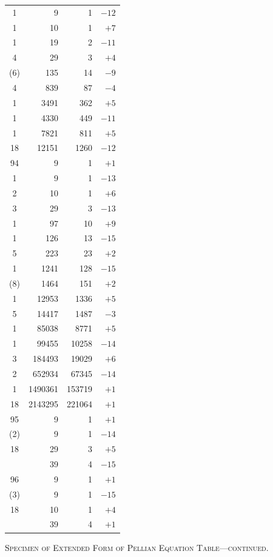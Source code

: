 \documentclass[11pt]{article}
\begin{document}
\begin{center}
\begin{tabular}{|c|r|r|r|}
1 & 9 & 1 & $-12$ \\
1 & 10 & 1 & $+7$ \\
1 & 19 & 2 & $-11$ \\
4 & 29 & 3 & $+4$ \\
(6) & 135 & 14 & $-9$ \\
4 & 839 & 87 & $-4$ \\
1 & 3491 & 362 & $+5$ \\
1 & 4330 & 449 & $-11$ \\
1 & 7821 & 811 & $+5$ \\
18 & 12151 & 1260 & $-12$ \\
\hline
94 & 9 & 1 & $+1$ \\
1 & 9 & 1 & $-13$ \\
2 & 10 & 1 & $+6$ \\
3 & 29 & 3 & $-13$ \\
1 & 97 & 10 & $+9$ \\
1 & 126 & 13 & $-15$ \\
5 & 223 & 23 & $+2$ \\
1 & 1241 & 128 & $-15$ \\
(8) & 1464 & 151 & $+2$ \\
1 & 12953 & 1336 & $+5$ \\
5 & 14417 & 1487 & $-3$ \\
1 & 85038 & 8771 & $+5$ \\
1 & 99455 & 10258 & $-14$ \\
3 & 184493 & 19029 & $+6$ \\
2 & 652934 & 67345 & $-14$ \\
1 & 1490361 & 153719 & $+1$ \\
18 & 2143295 & 221064 & $+1$ \\
\hline
95 & 9 & 1 & $+1$ \\
(2) & 9 & 1 & $-14$ \\
18 & 29 & 3 & $+5$ \\
 & 39 & 4 & $-15$ \\
\hline
96 & 9 & 1 & $+1$ \\
(3) & 9 & 1 & $-15$ \\
18 & 10 & 1 & $+4$ \\
 & 39 & 4 & $+1$ \\
\hline
\end{tabular}
\end{center}
\begin{center}
\small\textsc{Specimen of Extended Form of Pellian Equation Table---continued.}
\end{center}
\end{document}
